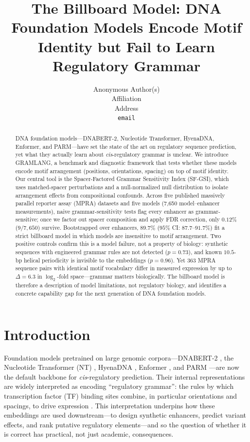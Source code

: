 \documentclass{article}
\title{The Billboard Model: DNA Foundation Models Encode Motif Identity but Fail to Learn Regulatory Grammar}
\author{%
  Anonymous Author(s) \\
  Affiliation \\
  Address \\
  \texttt{email}
}
\begin{document}
\maketitle

\begin{abstract}
DNA foundation models---DNABERT-2, Nucleotide Transformer, HyenaDNA, Enformer, and PARM---have set the state of the art on regulatory sequence prediction, yet what they actually learn about \emph{cis}-regulatory grammar is unclear. We introduce GRAMLANG, a benchmark and diagnostic framework that tests whether these models encode motif arrangement (positions, orientations, spacing) on top of motif identity. Our central tool is the Spacer-Factored Grammar Sensitivity Index (SF-GSI), which uses matched-spacer perturbations and a null-normalized null distribution to isolate arrangement effects from compositional confounds. Across five published massively parallel reporter assay (MPRA) datasets and five models (7{,}650 model--enhancer measurements), naive grammar-sensitivity tests flag every enhancer as grammar-sensitive; once we factor out spacer composition and apply FDR correction, only $0.12\%$ ($9/7{,}650$) survive. Bootstrapped over enhancers, $89.7\%$ ($95\%$ CI: $87.7$--$91.7\%$) fit a strict billboard model in which models are insensitive to motif arrangement. Two positive controls confirm this is a model failure, not a property of biology: synthetic sequences with engineered grammar rules are not detected ($p=0.73$), and known $10.5$-bp helical periodicity is invisible to the embeddings ($p=0.96$). Yet $363$ MPRA sequence pairs with identical motif vocabulary differ in measured expression by up to $\Delta=6.3$ in $\log_2$-fold space---grammar matters biologically. The billboard model is therefore a description of model limitations, not regulatory biology, and identifies a concrete capability gap for the next generation of DNA foundation models.
\end{abstract}

\section{Introduction}
\label{sec:intro}

Foundation models pretrained on large genomic corpora---DNABERT-2 \citep{zhou2023dnabert2}, the Nucleotide Transformer (NT) \citep{dalla2025nt}, HyenaDNA \citep{nguyen2023hyenadna}, Enformer \citep{avsec2021enformer}, and PARM \citep{aerts2024parm}---are now the default backbone for \emph{cis}-regulatory prediction. Their internal representations are widely interpreted as encoding ``regulatory grammar'': the rules by which transcription factor (TF) binding sites combine, in particular orientations and spacings, to drive expression \citep{sample2019deep}. This interpretation underpins how these embeddings are used downstream---to design synthetic enhancers, predict variant effects, and rank putative regulatory elements---and so the question of whether it is correct has practical, not just academic, consequences.
\end{document}
